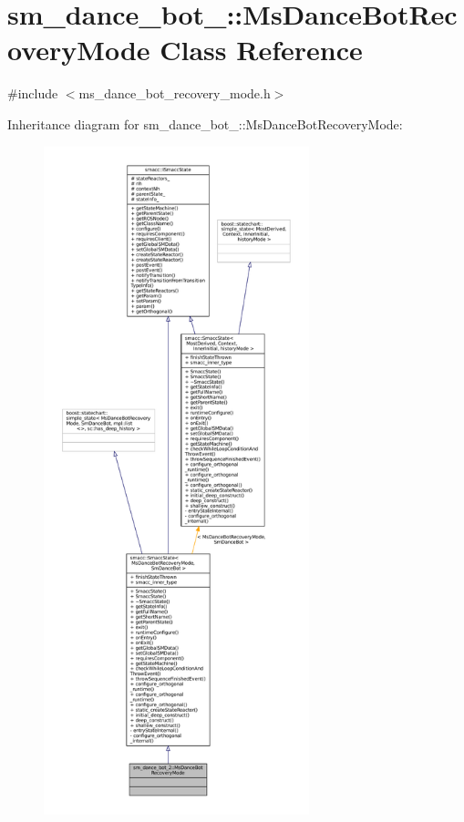 \hypertarget{classsm__dance__bot__2_1_1MsDanceBotRecoveryMode}{}\section{sm\+\_\+dance\+\_\+bot\+\_\+:\+:Ms\+Dance\+Bot\+Recovery\+Mode Class Reference}
\label{classsm__dance__bot__2_1_1MsDanceBotRecoveryMode}


{\ttfamily \#include $<$ms\+\_\+dance\+\_\+bot\+\_\+recovery\+\_\+mode.\+h$>$}



Inheritance diagram for sm\+\_\+dance\+\_\+bot\+\_\+:\+:Ms\+Dance\+Bot\+Recovery\+Mode\+:
\nopagebreak
\begin{figure}[H]
\begin{center}
\leavevmode
\includegraphics[height=550pt]{classsm__dance__bot__2_1_1MsDanceBotRecoveryMode__inherit__graph}
\end{center}
\end{figure}


